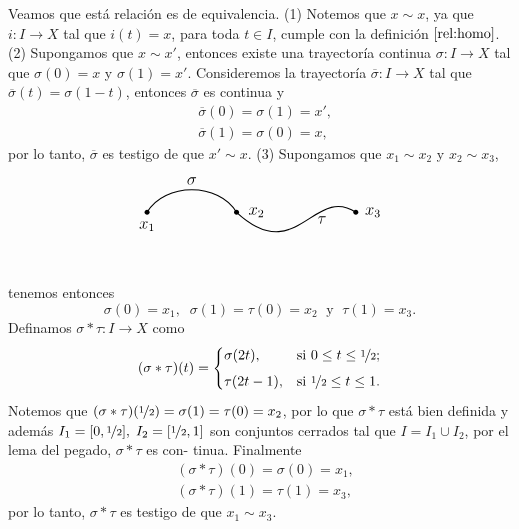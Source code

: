 Veamos que está relación es de equivalencia. (1) Notemos que $x\sim x$, ya que $i:I\to X$ tal que $i(t)=x$, para toda $t\in I$, cumple con la definición $\ref{rel:homo}$. (2) Supongamos que $x\sim x'$, entonces existe una trayectoría continua $\sigma:I\to X$ tal que $\sigma(0)=x$ y $\sigma(1)=x'$. Consideremos la trayectoría $\overline{\sigma}:I\to X$ tal que $\overline{\sigma}(t)=\sigma(1-t)$, entonces $\overline{\sigma}$ es continua  y
\begin{align*}
    &\overline{\sigma}(0)=\sigma(1)=x',\\
    &\overline{\sigma}(1)=\sigma(0)=x,
\end{align*}
por lo tanto, $\overline{\sigma}$ es testigo de que $x'\sim x$. (3) Supongamos que $x_1\sim x_2$ y $x_2\sim x_3$, 
\[
\begin{tikzpicture}[x=1.5cm, y=0.7cm, font=\large]
  \coordinate (x1) at (0,0);
  \coordinate (x2) at (1.5,0);
  \coordinate (x3) at (3.5,0);


  \fill (x1) circle (1.8pt) node[below=3pt] {$x_1$};
  \fill (x2) circle (1.8pt) node[right=5pt] {$x_2$};
  \fill (x3) circle (1.8pt) node[right=3pt] {$x_3$};


  \draw[thick, -, >=stealth] (x1) to[bend left=60] node[midway, yshift=1.5ex] {$\sigma$} (x2);

  \draw[thick, -, >=stealth] (x2) .. controls ++(1,-2) and ++(-0.7, 1) .. (x3)
    node[near end, below=2pt, xshift=-1ex] {$\tau$};

\end{tikzpicture}
\]
tenemos entonces
\begin{equation*}
    \sigma(0)=x_1,\;\; \sigma(1)=\tau(0)=x_2\; \text{ y }\; \tau(1)=x_3.
\end{equation*}
Definamos $\sigma*\tau:I\to X$ como 
\begin{equation}
\label{producto entre trayectorias}
(\sigma * \tau)(t) = 
\begin{cases} 
\sigma(2t), & \text{si } 0 \leq t \leq \nicefrac{1}{2}; \\[1ex]
\tau(2t - 1), & \text{si } \nicefrac{1}{2} \leq t \leq 1. 
\end{cases}
\end{equation}
Notemos que $(\sigma*\tau)(\nicefrac{1}{2})=\sigma(1)=\tau(0)=x_2$, por lo que $\sigma*\tau$ está bien definida y además $I_1=[0,\nicefrac{1}{2}],\; I_2=[\nicefrac{1}{2},1]$ son conjuntos cerrados tal que $I=I_1\cup I_2$, por el lema del pegado, $\sigma*\tau$ es con- tinua. Finalmente 
\begin{align*}
    &(\sigma*\tau)(0)=\sigma(0)=x_1,\\
    &(\sigma*\tau)(1)=\tau(1)=x_3,
\end{align*}
por lo tanto, $\sigma*\tau$ es testigo de que $x_1\sim x_3$. 

